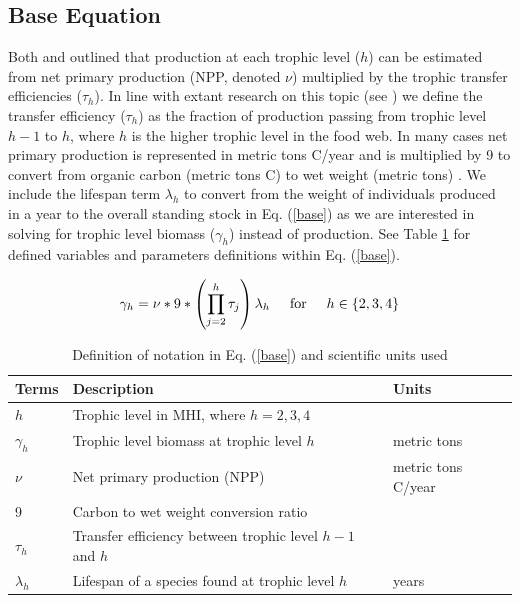 \documentclass[oneside,12pt,final]{sty/ucthesis-CA2012}
\let\cite\citep                             %
\begin{document}
\begin{mainmatter}
\subsection{Base Equation}
Both \citet{lalli1997biological} and \citet{libralato2008novel} outlined that production at each trophic level ($h$) can be estimated from net primary production  (NPP, denoted $\nu$) multiplied by the trophic transfer efficiencies ($\tau_h$). In line with extant research on this topic (see \citealt{cury2005trophodynamic, libralato2008novel, chassot2010global, trebilco2013ecosystem, watson2014primary}) we define the transfer efficiency ($\tau_h$) as the fraction of production passing from trophic level $h-1$ to $h$, where $h$ is the higher trophic level in the food web. In many cases net primary production is represented in metric tons C/year and is multiplied by 9 to convert from organic carbon (metric tons C) to wet weight (metric tons) \cite{strathmann1967estimating, pauly1995primary, chassot2010global}. We include the lifespan term $\lambda_h$ to convert from the weight of individuals produced in a year to the overall standing stock in Eq. (\ref{base}) as we are interested in solving for trophic level biomass ($\gamma_h$) instead of production. See Table \ref{description} for defined variables and parameters definitions within Eq. (\ref{base}).

\begin{equation} \label{base}
\gamma_h = \nu * 9 * \left( \prod_{j=2}^{h} \tau_j \right) \lambda_h \hspace{5mm} \text{for} \hspace{5mm} h \in \{2, 3, 4\}
\end{equation}

\begin{table}[H]
\centering
\caption{Definition of notation in Eq. (\ref{base}) and scientific units used}
\begin{tabular}{l|l|l}
  \hline \small
 Terms & Description & Units  \\ 
   \hline
   $h$ & Trophic level in MHI, where $h = 2,3,4$  & \\
   $\gamma_h$ &  Trophic level biomass at trophic level $h$ & metric tons  \\
   $\nu$ & Net primary production (NPP) & metric tons C/year \\
   9 & Carbon to wet weight conversion ratio &  \\
   $\tau_{h}$ & Transfer efficiency between trophic level $h-1$ and $h$ &   \\  
   $\lambda_h$ & Lifespan of a species found at trophic level $h$ & years \\
   \hline
\end{tabular} 
\label{description}
\end{table}


\end{mainmatter}
\end{document}
